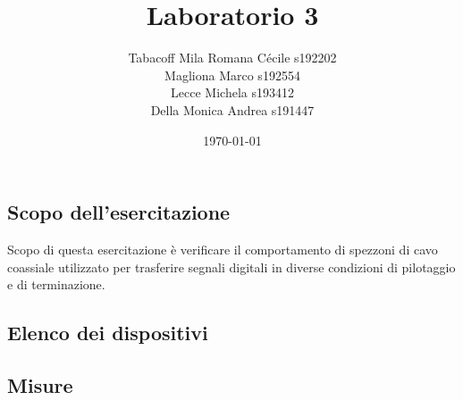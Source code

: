 \documentclass[a4paper]{article}
\begin{document}
\title{Laboratorio 3}
\author{
        Tabacoff Mila Romana Cécile s192202\\
        Magliona Marco s192554 \\
        Lecce Michela s193412\\
        Della Monica Andrea s191447}

\date{\today}
\maketitle

\newpage

\begin{tcolorbox}[breakable,colback=cyan,colframe=cyan]
\section*{Scopo dell'esercitazione}
\end{tcolorbox}

Scopo di questa esercitazione è verificare il comportamento di spezzoni di cavo coassiale utilizzato per trasferire segnali digitali in diverse condizioni di pilotaggio e di terminazione.

\begin{tcolorbox}[breakable,colback=cyan,colframe=cyan]
\section*{Elenco dei dispositivi}
\end{tcolorbox}

\begin{tcolorbox}[breakable,colback=cyan,colframe=cyan]
\section*{Misure}
\end{tcolorbox}
\end{document}
